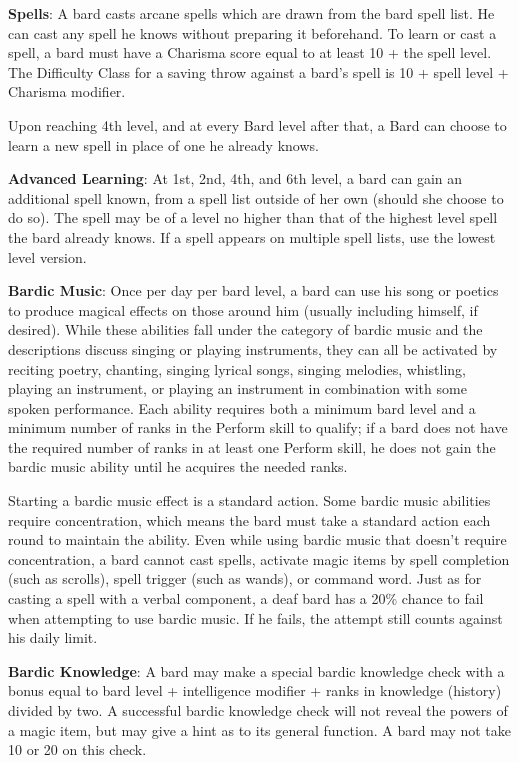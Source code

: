 \textbf{Spells}: A bard casts arcane spells which are drawn from the bard spell list. He can cast any spell he knows without preparing it beforehand. To learn or cast a spell, a bard must have a Charisma score equal to at least 10 + the spell level. The Difficulty Class for a saving throw against a bard's spell is 10 + spell level + Charisma modifier.

Upon reaching 4th level, and at every Bard level after that, a Bard can choose to learn a new spell in place of one he already knows. 

\textbf{Advanced Learning}: At 1st, 2nd, 4th, and 6th level, a bard can gain an additional spell known, from a spell list outside of her own (should she choose to do so). The spell may be of a level no higher than that of the highest level spell the bard already knows. If a spell appears on multiple spell lists, use the lowest level version.

\textbf{Bardic Music}: Once per day per bard level, a bard can use his song or poetics to produce magical effects on those around him (usually including himself, if desired). While these abilities fall under the category of bardic music and the descriptions discuss singing or playing instruments, they can all be activated by reciting poetry, chanting, singing lyrical songs, singing melodies, whistling, playing an instrument, or playing an instrument in combination with some spoken performance. Each ability requires both a minimum bard level and a minimum number of ranks in the Perform skill to qualify; if a bard does not have the required number of ranks in at least one Perform skill, he does not gain the bardic music ability until he acquires the needed ranks.

Starting a bardic music effect is a standard action. Some bardic music abilities require concentration, which means the bard must take a standard action each round to maintain the ability. Even while using bardic music that doesn’t require concentration, a bard cannot cast spells, activate magic items by spell completion (such as scrolls), spell trigger (such as wands), or command word. Just as for casting a spell with a verbal component, a deaf bard has a 20\% chance to fail when attempting to use bardic music. If he fails, the attempt still counts against his daily limit.

\textbf{Bardic Knowledge}: A bard may make a special bardic knowledge check with a bonus equal to bard level + intelligence modifier + ranks in knowledge (history) divided by two. A successful bardic knowledge check will not reveal the powers of a magic item, but may give a hint as to its general function. A bard may not take 10 or 20 on this check.

